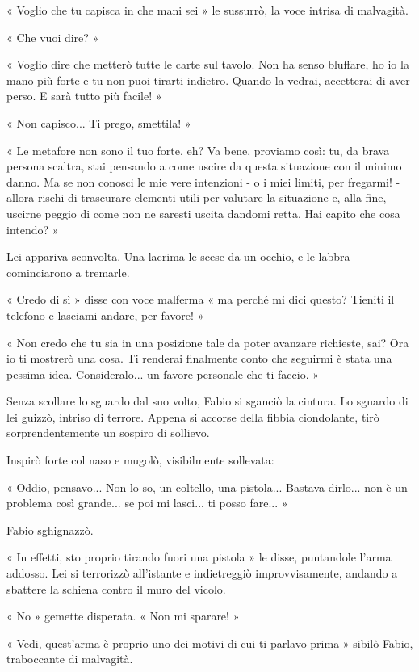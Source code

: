 « Voglio che tu capisca in che mani sei » le sussurrò, la voce intrisa di malvagità.

« Che vuoi dire? »

« Voglio dire che metterò tutte le carte sul tavolo. Non ha senso bluffare, ho io la mano più forte e tu non puoi tirarti indietro. Quando la vedrai, accetterai di aver perso. E sarà tutto più facile! »

« Non capisco... Ti prego, smettila! »

« Le metafore non sono il tuo forte, eh? Va bene, proviamo così: tu, da brava persona scaltra, stai pensando a come uscire da questa situazione con il minimo danno. Ma se non conosci le mie vere intenzioni - o i miei limiti, per fregarmi! - allora rischi di trascurare elementi utili per valutare la situazione e, alla fine, uscirne peggio di come non ne saresti uscita dandomi retta. Hai capito che cosa intendo? »

Lei appariva sconvolta. Una lacrima le scese da un occhio, e le labbra cominciarono a tremarle.

« Credo di sì » disse con voce malferma « ma perché mi dici questo? Tieniti il telefono e lasciami andare, per favore! »

« Non credo che tu sia in una posizione tale da poter avanzare richieste, sai? Ora io ti mostrerò una cosa. Ti renderai finalmente conto che seguirmi è stata una pessima idea. Consideralo... un favore personale che ti faccio. »

Senza scollare lo sguardo dal suo volto, Fabio si sganciò la cintura. Lo sguardo di lei guizzò, intriso di terrore. Appena si accorse della fibbia ciondolante, tirò sorprendentemente un sospiro di sollievo.

Inspirò forte col naso e mugolò, visibilmente sollevata:

« Oddio, pensavo... Non lo so, un coltello, una pistola... Bastava dirlo... non è un problema così grande... se poi mi lasci... ti posso fare... »

Fabio sghignazzò.

« In effetti, sto proprio tirando fuori una pistola » le disse, puntandole l'arma addosso. Lei si terrorizzò all'istante e indietreggiò improvvisamente, andando a sbattere la schiena contro il muro del vicolo.

« No » gemette disperata. « Non mi sparare! »

« Vedi, quest'arma è proprio uno dei motivi di cui ti parlavo prima » sibilò Fabio, traboccante di malvagità.


